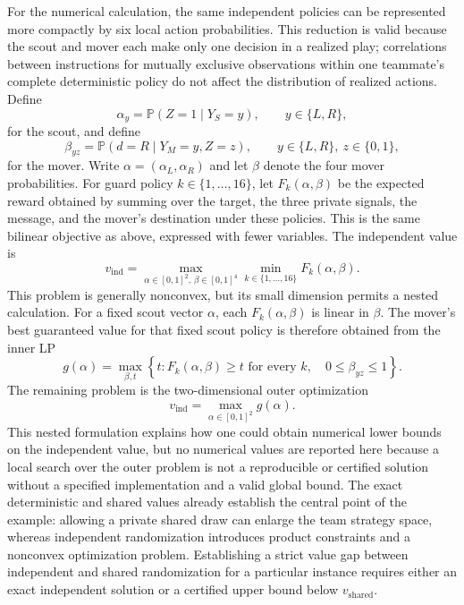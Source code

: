 For the numerical calculation, the same independent policies can be represented more compactly by six local action probabilities. This reduction is valid because the scout and mover each make only one decision in a realized play; correlations between instructions for mutually exclusive observations within one teammate's complete deterministic policy do not affect the distribution of realized actions. Define
\[
    \alpha_y
    =
    \mathbb{P}(Z=1\mid Y_S=y),
    \qquad y\in\{L,R\},
\]
for the scout, and define
\[
    \beta_{yz}
    =
    \mathbb{P}(d=R\mid Y_M=y,Z=z),
    \qquad
    y\in\{L,R\},\ z\in\{0,1\},
\]
for the mover. Write $\alpha=(\alpha_L,\alpha_R)$ and let $\beta$ denote the four mover probabilities. For guard policy $k\in\{1,\ldots,16\}$, let $F_k(\alpha,\beta)$ be the expected reward obtained by summing over the target, the three private signals, the message, and the mover's destination under these policies. This is the same bilinear objective as above, expressed with fewer variables. The independent value is
\[
    v_{\mathrm{ind}}
    =
    \max_{\alpha\in[0,1]^2,\,\beta\in[0,1]^4}
    \min_{k\in\{1,\ldots,16\}}
    F_k(\alpha,\beta).
\]
This problem is generally nonconvex, but its small dimension permits a nested calculation. For a fixed scout vector $\alpha$, each $F_k(\alpha,\beta)$ is linear in $\beta$. The mover's best guaranteed value for that fixed scout policy is therefore obtained from the inner LP
\[
    g(\alpha)
    =
    \max_{\beta,t}
    \left\{
      t:
      F_k(\alpha,\beta)\geq t
      \text{ for every }k,
      \quad
      0\leq\beta_{yz}\leq1
    \right\}.
\]
The remaining problem is the two-dimensional outer optimization
\[
    v_{\mathrm{ind}}
    =
    \max_{\alpha\in[0,1]^2}g(\alpha).
\]
This nested formulation explains how one could obtain numerical lower bounds on the independent value, but no numerical values are reported here because a local search over the outer problem is not a reproducible or certified solution without a specified implementation and a valid global bound. The exact deterministic and shared values already establish the central point of the example: allowing a private shared draw can enlarge the team strategy space, whereas independent randomization introduces product constraints and a nonconvex optimization problem. Establishing a strict value gap between independent and shared randomization for a particular instance requires either an exact independent solution or a certified upper bound below $v_{\mathrm{shared}}$.

